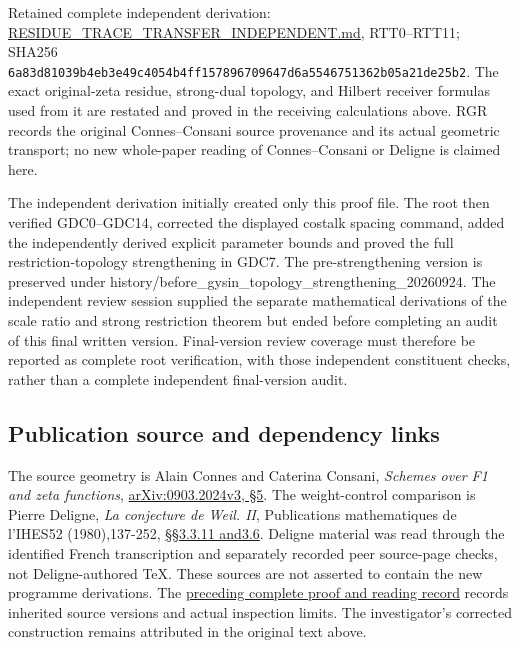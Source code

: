 Retained complete independent derivation:
\href{https://github.com/KokunoYumeto/zeta-function-research-reader/blob/36a82ecca98addb8a98b48204e349737856c7223/workbenches/splitzero-tandem/continuations/20260924-cohomology-weight-and-character-lifts/gct-weight-control/proofs/RESIDUE_TRACE_TRANSFER_INDEPENDENT.md}{RESIDUE\_TRACE\_TRANSFER\_INDEPENDENT.md},
RTT0--RTT11; SHA256
\texttt{6a83d81039b4eb3e49c4054b4ff157896709647d6a5546751362b05a21de25b2}.
The exact original-zeta residue, strong-dual topology, and Hilbert
receiver formulas used from it are restated and proved in the receiving
calculations above. RGR records the original Connes--Consani source
provenance and its actual geometric transport; no new whole-paper
reading of Connes--Consani or Deligne is claimed here.

The independent derivation initially created only this proof file. The
root then verified GDC0--GDC14, corrected the displayed costalk spacing
command, added the independently derived explicit parameter bounds and
proved the full restriction-topology strengthening in GDC7. The
pre-strengthening version is preserved under
history/before\_gysin\_topology\_strengthening\_20260924. The
independent review session supplied the separate mathematical
derivations of the scale ratio and strong restriction theorem but ended
before completing an audit of this final written version. Final-version
review coverage must therefore be reported as complete root
verification, with those independent constituent checks, rather than a
complete independent final-version audit.

\subsection{Publication source and dependency
links}\label{publication-source-and-dependency-links}

The source geometry is Alain Connes and Caterina Consani, \emph{Schemes
over F1 and zeta functions},
\href{https://arxiv.org/abs/0903.2024v3}{arXiv:0903.2024v3, §5}. The
weight-control comparison is Pierre Deligne, \emph{La conjecture de
Weil. II}, Publications mathematiques de l'IHES52 (1980),137-252,
\href{https://www.numdam.org/item/PMIHES_1980__52__137_0/}{§§3.3.11
and3.6}. Deligne material was read through the identified French
transcription and separately recorded peer source-page checks, not
Deligne-authored TeX. These sources are not asserted to contain the new
programme derivations. The
\href{https://github.com/KokunoYumeto/zeta-function-research-reader/blob/36a82ecca98addb8a98b48204e349737856c7223/workbenches/splitzero-tandem/continuations/20260924-cohomology-weight-and-character-lifts/BUILD_AND_REVIEW.md}{preceding
complete proof and reading record} records inherited source versions and
actual inspection limits. The investigator's corrected construction
remains attributed in the original text above.
